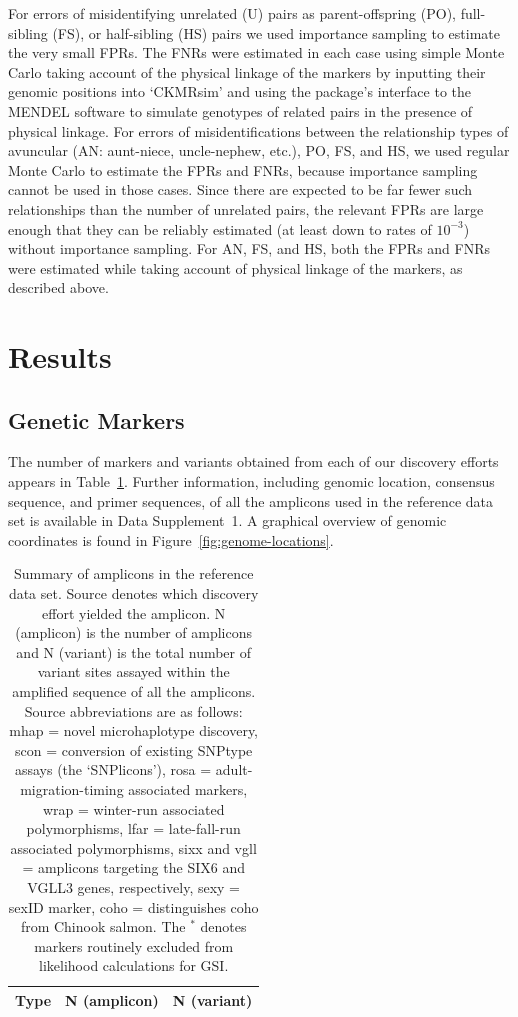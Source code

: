 For errors of misidentifying
unrelated (U) pairs as parent-offspring (PO), full-sibling (FS), or half-sibling (HS)
pairs we used importance sampling to estimate the very small FPRs.  The
FNRs were estimated in each case using simple Monte Carlo taking account
of the physical linkage of the markers by inputting their genomic positions into
`CKMRsim' and using the package's interface to the MENDEL \citep{lange2013mendel}
software to simulate genotypes of related pairs
in the presence of physical linkage.  
For errors of misidentifications between the relationship
types of avuncular (AN: aunt-niece, uncle-nephew, etc.), PO, FS, and HS,
we used regular Monte Carlo to estimate the FPRs and FNRs, because
importance sampling cannot be used in those cases. Since there are
expected to be far fewer such relationships than the number of unrelated
pairs, the relevant FPRs are large enough that they can be reliably estimated
(at least down to rates of $10^{-3}$) without importance sampling.
For AN, FS, and HS, both the
FPRs and FNRs were estimated while taking account of physical linkage
of the markers, as described above.

\section*{Results}

\subsection*{Genetic Markers}

The number of markers and variants obtained from each of our discovery efforts appears in
Table~\ref{tab:loci-summ}.  Further information, including genomic location, consensus sequence, and primer sequences,
of all the amplicons used in the reference data set is available
in Data Supplement~1.  A graphical overview of genomic coordinates is found in Figure~\ref{fig:genome-locations}.


\begin{table}
\caption{\footnotesize  Summary of amplicons in the reference data set.  Source denotes
which discovery effort yielded the amplicon. N (amplicon) is the number of amplicons
and N (variant) is the total number of variant sites assayed within the amplified sequence of all the
amplicons.  Source abbreviations are as follows: mhap = novel microhaplotype discovery, scon = conversion of existing SNPtype
assays (the `SNPlicons'), rosa = adult-migration-timing associated markers, wrap = winter-run associated
polymorphisms, lfar = late-fall-run associated polymorphisms, sixx and vgll = amplicons
targeting the SIX6 and VGLL3 genes, respectively, sexy = sexID marker, coho =
distinguishes coho from Chinook salmon. The $^*$ denotes markers routinely
excluded from likelihood calculations for GSI.}
\label{tab:loci-summ}
\begin{tabular*}{0.48\textwidth}{@{\extracolsep{\fill}} lrr}
\hline\hline
Type&N (amplicon)&N (variant)\tabularnewline
\hline

\end{tabular*}
\end{table}

